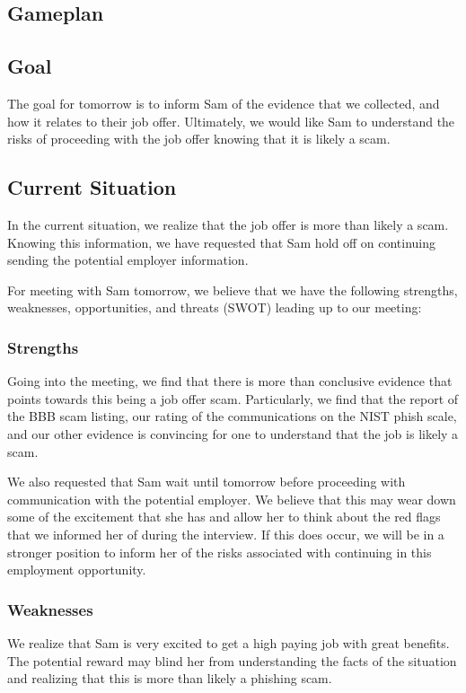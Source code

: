 \begin{fullwidth}
\section{Gameplan} %
\subsection{Goal}
The goal for tomorrow is to inform Sam of the evidence that we collected, and how it relates to their job offer. Ultimately, we would like Sam to understand the risks of proceeding with the job offer knowing that it is likely a scam.
\subsection{Current Situation}
In the current situation, we realize that the job offer is more than likely a scam. Knowing this information, we have requested that Sam hold off on continuing sending the potential employer information.

For meeting with Sam tomorrow, we believe that we have the following strengths, weaknesses, opportunities, and threats (SWOT) leading up to our meeting:

\subsubsection{Strengths}
Going into the meeting, we find that there is more than conclusive evidence that points towards this being a job offer scam. Particularly, we find that the report of the BBB scam listing, our rating of the communications on the NIST phish scale, and our other evidence is convincing for one to understand that the job is likely a scam.

We also requested that Sam wait until tomorrow before proceeding with communication with the potential employer. We believe that this may wear down some of the excitement that she has and allow her to think about the red flags that we informed her of during the interview. If this does occur, we will be in a stronger position to inform her of the risks associated with continuing in this employment opportunity.

\subsubsection{Weaknesses}
We realize that Sam is very excited to get a high paying job with great benefits. The potential reward may blind her from understanding the facts of the situation and realizing that this is more than likely a phishing scam.


\end{fullwidth}
